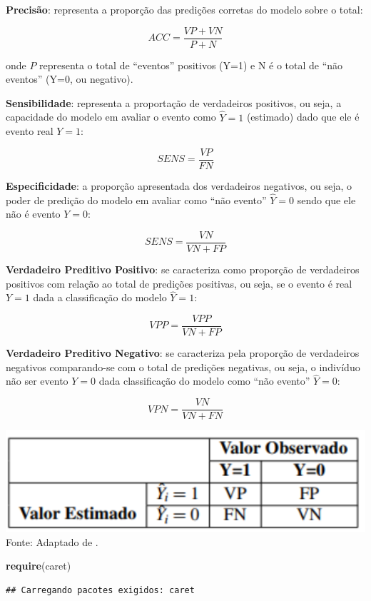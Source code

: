 \documentclass[12pt,brazil,]{book}
\newenvironment{Shaded}{\begin{snugshade}}{\end{snugshade}}
\newcommand{\KeywordTok}[1]{\textcolor[rgb]{0.13,0.29,0.53}{\textbf{#1}}}
\newcommand{\NormalTok}[1]{#1}
\begin{document}
\textbf{Precisão}: representa a proporção das predições corretas do
modelo sobre o total:

\[
ACC=\frac{VP+VN}{P+N}
\]

onde \(P\) representa o total de ``eventos'' positivos (Y=1) e N é o
total de ``não eventos'' (Y=0, ou negativo).

\textbf{Sensibilidade}: representa a proportação de verdadeiros
positivos, ou seja, a capacidade do modelo em avaliar o evento como
\(\hat Y=1\) (estimado) dado que ele é evento real \(Y=1\):

\[
SENS=\frac{VP}{FN}
\]

\textbf{Especificidade}: a proporção apresentada dos verdadeiros
negativos, ou seja, o poder de predição do modelo em avaliar como ``não
evento'' \(\hat Y=0\) sendo que ele não é evento \(Y=0\):

\[
SENS=\frac{VN}{VN+FP}
\]

\textbf{Verdadeiro Preditivo Positivo}: se caracteriza como proporção de
verdadeiros positivos com relação ao total de predições positivas, ou
seja, se o evento é real \(Y=1\) dada a classificação do modelo
\(\hat Y=1\):

\[
VPP=\frac{VPP}{VN+FP}
\]

\textbf{Verdadeiro Preditivo Negativo}: se caracteriza pela proporção de
verdadeiros negativos comparando-se com o total de predições negativas,
ou seja, o indivíduo não ser evento \(Y=0\) dada classificação do modelo
como ``não evento'' \(\hat Y=0\):

\[
VPN=\frac{VN}{VN+FN}
\]

\includegraphics{matriz.png} Fonte: Adaptado de \textcite{Fawcett2006}.

\begin{Shaded}
\begin{Highlighting}[]
\KeywordTok{require}\NormalTok{(caret)}
\end{Highlighting}
\end{Shaded}

\begin{verbatim}
## Carregando pacotes exigidos: caret
\end{verbatim}
\end{document}
